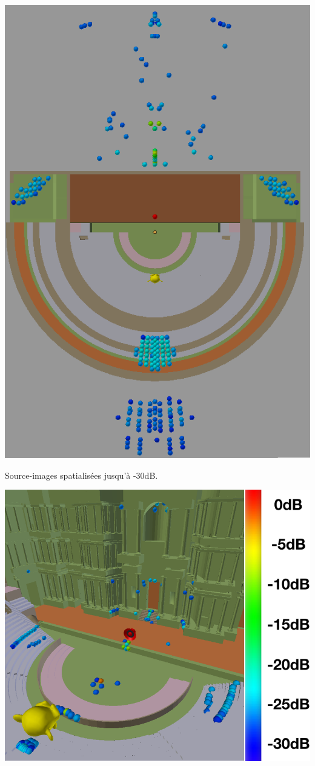 \begin{figureth}	
	\begin{subfigureth}{0.36\textwidth}
		\includegraphics[width=\linewidth]{images/SI30dBbis}
		\caption{Source-images spatialisées jusqu'à -30dB.}
		\label{SI30dBbis}
	\end{subfigureth}
	\begin{subfigureth}{0.61\textwidth}
		\includegraphics[width=\linewidth]{images/SI30dB}

\end{subfigureth}
\end{figureth}
